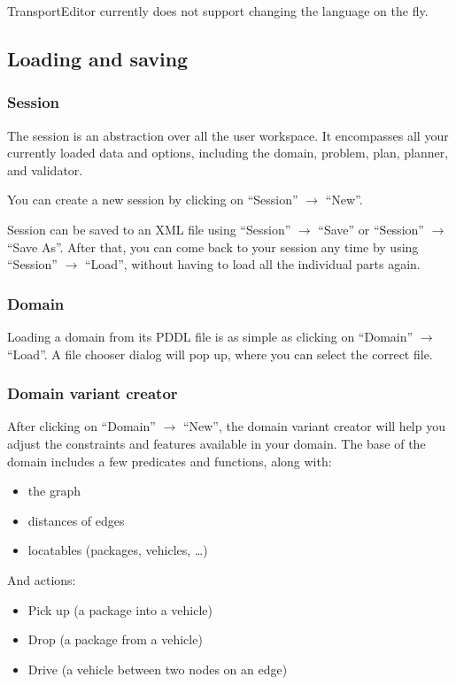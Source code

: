 TransportEditor currently does not support changing the language on the fly.

\subsection*{Loading and saving}
\subsubsection*{Session}
The session is an abstraction over all the user workspace. It encompasses all your currently loaded data and options,
including the domain, problem, plan, planner, and validator.

You can create a new session by clicking on ``Session'' $\to$ ``New''.

Session can be saved to an XML file using ``Session'' $\to$ ``Save'' or ``Session'' $\to$ ``Save As''.
After that, you can come back to your session any time by using ``Session'' $\to$ ``Load'', without
having to load all the individual parts again.

\subsubsection*{Domain}
Loading a domain from its PDDL file is as simple as clicking on ``Domain'' $\to$ ``Load''.
A file chooser dialog will pop up, where you can select the correct file.

\subsubsection*{Domain variant creator}
After clicking on ``Domain'' $\to$ ``New'', the domain variant creator will help
you adjust the constraints and features available in your domain.
The base of the domain includes a few predicates and functions, along with:

\begin{itemize}
\item the graph

\item distances of edges

\item locatables (packages, vehicles, …)
\end{itemize}

And actions:

\begin{itemize}
\item Pick up (a package into a vehicle)

\item Drop (a package from a vehicle)

\item Drive (a vehicle between two nodes on an edge)
\end{itemize}

